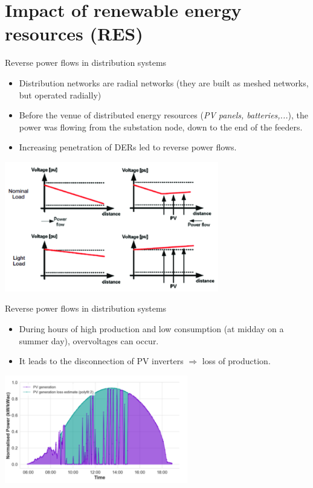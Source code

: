\section{Impact of renewable energy resources (RES)}
\begin{frame}{Reverse power flows in distribution systems}
\begin{itemize}
    \item Distribution networks are radial networks (they are built as meshed networks, but operated radially)
    \item Before the venue of distributed energy resources (\emph{PV panels, batteries,...}), the power was flowing from the substation node, down to the end of the feeders.
    \item Increasing penetration of DERs led to reverse power flows.
\end{itemize}
\begin{center}
\includegraphics[width=0.7\textwidth]{images/VoltageProfile.png}
\end{center}
\end{frame}

\begin{frame}{Reverse power flows in distribution systems}
\begin{itemize}
    \item During hours of high production and low consumption (at midday on a summer day), overvoltages can occur.
    \item It leads to the disconnection of PV inverters $\Rightarrow$ loss of production.
\end{itemize}
\begin{center}
\includegraphics[width=0.6\textwidth]{images/PVdisconnection.png}
\end{center}
\end{frame}

